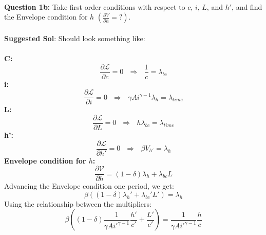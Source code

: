 \documentclass[11pt]{article}
\begin{document}
\ \\
\textbf{Question 1b:} Take first order conditions with respect to $c$, $i$, $L$, and $h'$, and find the Envelope condition for $h$ $\left(\frac{\partial V}{\partial h}=?\right)$.\\
 \ \\
\textbf{Suggested Sol}: Should look something like:\\
\ \\
\textbf{C:}\\
$$\frac{\partial \mathcal{L}}{\partial c}   =0\ \ \ \Rightarrow \ \ \ \frac{1}{c}  = \lambda_{bc}$$
\textbf{i:}\\
$$\frac{\partial \mathcal{L}}{\partial i}  =0\ \ \ \Rightarrow \ \ \ \gamma A i^{\gamma-1}\lambda_{h}=\lambda_{time}$$
\textbf{L:}\\
$$\frac{\partial \mathcal{L}}{\partial L}  =0\ \ \ \Rightarrow \ \ \ h\lambda_{bc}=\lambda_{time}$$
\textbf{h':}\\
$$\frac{\partial \mathcal{L}}{\partial h'}  =0\ \ \ \Rightarrow \ \ \ \beta V_{h'}=\lambda_h$$
\textbf{Envelope condition for $h$:}\\
$$\frac{\partial \mathcal{V}}{\partial h}  =(1-\delta)\lambda_h+\lambda_{bc}L$$
Advancing the Envelope condition one period, we get:
$$\beta \left((1-\delta)\lambda_h'+\lambda_{bc}'L'\right)=\lambda_h$$
Using the relationship between the multipliers:
$$\beta \left((1-\delta)\frac{1}{\gamma A i'^{\gamma-1}}\frac{h'}{c'}+\frac{L'}{c'}\right)=\frac{1}{\gamma A i'^{\gamma-1}}\frac{h}{c}$$
\end{document}
